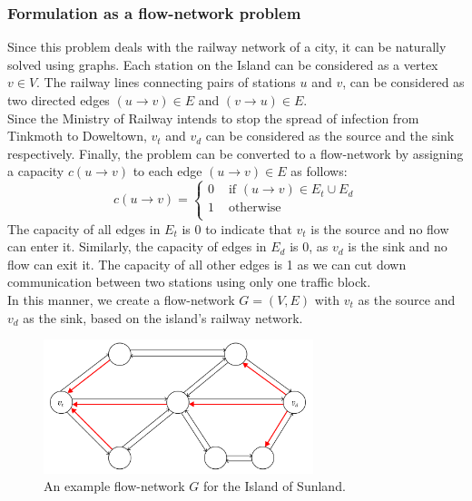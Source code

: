 \documentclass[12pt]{report}
\begin{document}
    \subsubsection*{Formulation as a flow-network problem}
    Since this problem deals with the railway network of a city, it can be naturally solved using graphs.
    Each station on the Island can be considered as a vertex $v \in V$.
    The railway lines connecting pairs of stations $u$ and $v$, can be considered as two directed edges $(u \to v) \in E$ and $(v \to u) \in E$. \\
    Since the Ministry of Railway intends to stop the spread of infection from Tinkmoth to Doweltown, $v_{t}$ and $v_{d}$
    can be considered as the source and the sink respectively.
    Finally, the problem can be converted to a flow-network by assigning a capacity $c(u \to v)$ to each edge $(u \to v) \in E$ as follows:
    \begin{equation}
        \label{eq:capacity}
        c(u \to v) = \begin{cases}
            0 & \text{ if } (u \to v) \in E_{t} \cup E_{d} \\
            1 & \text{ otherwise} \\
        \end{cases}
    \end{equation}
    The capacity of all edges in $E_{t}$ is 0 to indicate that $v_{t}$ is the source and no flow can enter it.
    Similarly, the capacity of edges in $E_{d}$ is 0, as $v_{d}$ is the sink and no flow can exit it.
    The capacity of all other edges is 1 as we can cut down communication between two stations using only one traffic block. \\
    In this manner, we create a flow-network $G = (V, E)$ with $v_{t}$ as the source and $v_{d}$ as the sink, based on the island's railway network. \hfill
    \begin{figure}[htp]
        \begin{center}
            \includegraphics[width=0.7\textwidth]{network.png}
        \end{center}
        \caption{An example flow-network $G$ for the Island of Sunland.}
        \label{fig:network}
    \end{figure}
\end{document}
